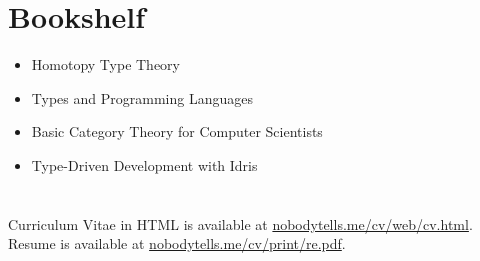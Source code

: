 \section{Bookshelf}
\begin{itemize}
  \item Homotopy Type Theory
  \item Types and Programming Languages
  \item Basic Category Theory for Computer Scientists
  \item Type-Driven Development with Idris
\end{itemize}

\section*{}
Curriculum Vitae in HTML is available at \href{https://nobodytells.me/cv/web/cv.html}{nobodytells.me/cv/web/cv.html}.\\
Resume is available at \href{https://nobodytells.me/cv/print/re.pdf}{nobodytells.me/cv/print/re.pdf}.


